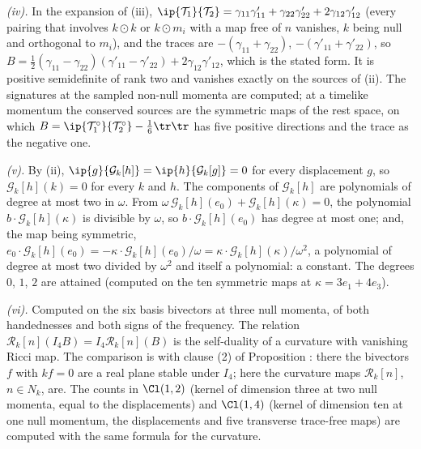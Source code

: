 \emph{(iv).} In the expansion of (iii), $\ip{\mathcal{T}_{1}}{\mathcal{T}_{2}} = \gamma_{11}\gamma'_{11} + \gamma_{22}\gamma'_{22} + 2\gamma_{12}\gamma'_{12}$ (every pairing that involves $k \odot k$ or $k \odot m_{i}$ with a map free of $n$ vanishes, $k$ being null and orthogonal to $m_{i}$), and the traces are $-(\gamma_{11} + \gamma_{22})$, $-(\gamma'_{11} + \gamma'_{22})$, so $B = \tfrac12(\gamma_{11} - \gamma_{22})(\gamma'_{11} - \gamma'_{22}) + 2\gamma_{12}\gamma'_{12}$, which is the stated form. It is positive semidefinite of rank two and vanishes exactly on the sources of (ii). The signatures at the sampled non-null momenta are computed; at a timelike momentum the conserved sources are the symmetric maps of the rest space, on which $B = \ip{\mathcal{T}_{1}^{\circ}}{\mathcal{T}_{2}^{\circ}} - \tfrac16\tr\tr$ has five positive directions and the trace as the negative one.

\emph{(v).} By (ii), $\ip{g}{\mathcal{G}_{k}[h]} = \ip{h}{\mathcal{G}_{k}[g]} = 0$ for every displacement $g$, so $\mathcal{G}_{k}[h](k) = 0$ for every $k$ and $h$. The components of $\mathcal{G}_{k}[h]$ are polynomials of degree at most two in $\omega$. From $\omega\,\mathcal{G}_{k}[h](e_{0}) + \mathcal{G}_{k}[h](\kappa) = 0$, the polynomial $b \cdot \mathcal{G}_{k}[h](\kappa)$ is divisible by $\omega$, so $b \cdot \mathcal{G}_{k}[h](e_{0})$ has degree at most one; and, the map being symmetric, $e_{0} \cdot \mathcal{G}_{k}[h](e_{0}) = -\kappa \cdot \mathcal{G}_{k}[h](e_{0})/\omega = \kappa \cdot \mathcal{G}_{k}[h](\kappa)/\omega^{2}$, a polynomial of degree at most two divided by $\omega^{2}$ and itself a polynomial: a constant. The degrees $0$, $1$, $2$ are attained (computed on the ten symmetric maps at $\kappa = 3e_{1} + 4e_{3}$).

\emph{(vi).} Computed on the six basis bivectors at three null momenta, of both handednesses and both signs of the frequency. The relation $\mathcal{R}_{k}[n](I_{4}B) = I_{4}\mathcal{R}_{k}[n](B)$ is the self-duality of a curvature with vanishing Ricci map. The comparison is with clause (2) of Proposition : there the bivectors $f$ with $kf = 0$ are a real plane stable under $I_{4}$; here the curvature maps $\mathcal{R}_{k}[n]$, $n \in N_{k}$, are. The counts in $\Cl(1,2)$ (kernel of dimension three at two null momenta, equal to the displacements) and $\Cl(1,4)$ (kernel of dimension ten at one null momentum, the displacements and five transverse trace-free maps) are computed with the same formula for the curvature.

